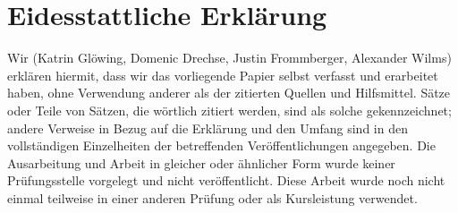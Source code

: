 \section{Eidesstattliche Erklärung}
Wir (Katrin Glöwing, Domenic Drechse, Justin Frommberger, Alexander Wilms) erklären hiermit, dass wir das vorliegende Papier selbst verfasst und erarbeitet haben, ohne Verwendung anderer als der zitierten Quellen und Hilfsmittel. Sätze oder Teile von Sätzen, die wörtlich zitiert werden, sind als solche gekennzeichnet; andere Verweise in Bezug auf die Erklärung und den Umfang sind in den vollständigen Einzelheiten der betreffenden Veröffentlichungen angegeben. Die Ausarbeitung und Arbeit in gleicher oder ähnlicher Form wurde keiner Prüfungsstelle vorgelegt und nicht veröffentlicht. Diese Arbeit wurde noch nicht einmal teilweise in einer anderen Prüfung oder als Kursleistung verwendet.
